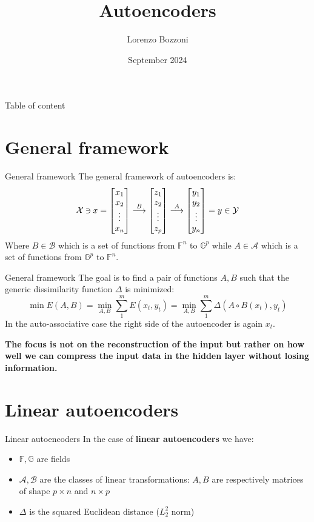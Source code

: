 \documentclass{beamer}
\title{Autoencoders}
\author{Lorenzo Bozzoni}
\institute{Politecnico di Milano}
\date{September 2024}
\newcommand{\revin}{\mathbin{\rotatebox[origin=c]{180}{$\in$}}}
\begin{document}
\frame{\titlepage}



\begin{frame}{Table of content}
    \tableofcontents
\end{frame}


\section{General framework}
\begin{frame}{General framework}
The general framework of autoencoders is:
\[
\mathcal{X} \revin x = 
\begin{bmatrix}
    x_1\\
    x_2\\
    \vdots\\
    x_n
\end{bmatrix}
\overset{B}{\longrightarrow}
\begin{bmatrix}
    z_1\\
    z_2\\
    \vdots\\
    z_p
\end{bmatrix}
\overset{A}{\longrightarrow}
\begin{bmatrix}
    y_1\\
    y_2\\
    \vdots\\
    y_n
\end{bmatrix}
= y \in \mathcal{Y}
\]
Where $B \in \mathcal{B}$ which is a set of functions from $\mathbb{F}^n$ to $\mathbb{G}^p$ while $A \in \mathcal{A}$ which is a set of functions from $\mathbb{G}^p$ to $\mathbb{F}^n$.
\end{frame}

\begin{frame}{General framework}
The goal is to find a pair of functions $A,B$ such that the generic dissimilarity function $\Delta$ is minimized:
\[
\min E(A,B) = \min_{A,B} \sum_1^m E(x_t,y_t) = \min_{A,B} \sum_1^m \Delta(A \circ B(x_t),y_t)  
\]
In the auto-associative case the right side of the autoencoder is again $x_t$.

\textbf{The focus is not on the reconstruction of the input but rather on how well we can compress the input data in the hidden layer without losing information.}
\end{frame}


\section{Linear autoencoders}
\begin{frame}{Linear autoencoders}
In the case of \textbf{linear autoencoders} we have:
\begin{itemize}
    \item $\mathbb{F},\mathbb{G}$ are fields
    \item $\mathcal{A},\mathcal{B}$ are the classes of linear transformations: $A,B$ are respectively matrices of shape $p \times n$ and $n \times p$
    \item $\Delta$ is the squared Euclidean distance ($L_2^2$ norm)
\end{itemize}
\end{frame}
\end{document}
